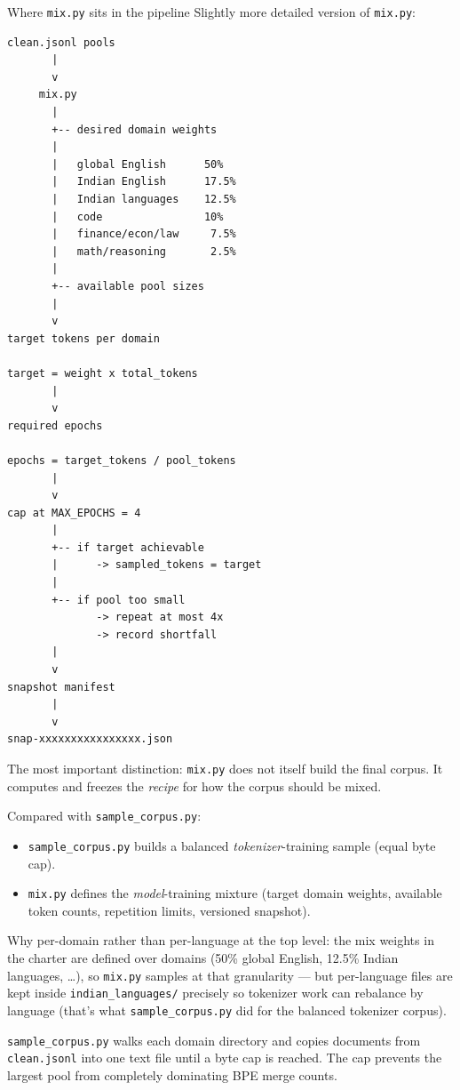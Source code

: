 \begin{paragraphblock}{Where \texttt{mix.py} sits in the pipeline}
  \newpage
  Slightly more detailed version of \texttt{mix.py}:
\begin{lstlisting}[style=shadedpython,language={},basicstyle=\scriptsize\ttfamily]
clean.jsonl pools
       |
       v
     mix.py
       |
       +-- desired domain weights
       |
       |   global English      50%
       |   Indian English      17.5%
       |   Indian languages    12.5%
       |   code                10%
       |   finance/econ/law     7.5%
       |   math/reasoning       2.5%
       |
       +-- available pool sizes
       |
       v
target tokens per domain

target = weight x total_tokens
       |
       v
required epochs

epochs = target_tokens / pool_tokens
       |
       v
cap at MAX_EPOCHS = 4
       |
       +-- if target achievable
       |      -> sampled_tokens = target
       |
       +-- if pool too small
              -> repeat at most 4x
              -> record shortfall
       |
       v
snapshot manifest
       |
       v
snap-xxxxxxxxxxxxxxxx.json
\end{lstlisting}

  The most important distinction: \texttt{mix.py} does not itself build the
  final corpus. It computes and freezes the \emph{recipe} for how the corpus
  should be mixed.

  Compared with \texttt{sample\_corpus.py}:
  \begin{itemize}
      \setlength{\itemsep}{0pt}
    \item \texttt{sample\_corpus.py} builds a balanced \emph{tokenizer}-training
      sample (equal byte cap).
    \item \texttt{mix.py} defines the \emph{model}-training mixture (target
        domain weights, available token counts, repetition limits, versioned
      snapshot).
  \end{itemize}

  Why per-domain rather than per-language at the top level: the mix weights
  in the charter are defined over domains (50\% global English, 12.5\%
  Indian languages, \ldots), so \texttt{mix.py} samples at that granularity
  --- but per-language files are kept inside \texttt{indian\_languages/}
  precisely so tokenizer work can rebalance by language (that's what
  \texttt{sample\_corpus.py} did for the balanced tokenizer corpus).

  \texttt{sample\_corpus.py} walks each domain directory and copies documents
  from \texttt{clean.jsonl} into one text file until a byte cap is reached. The
  cap prevents the largest pool from completely dominating BPE merge counts.


\end{paragraphblock}
